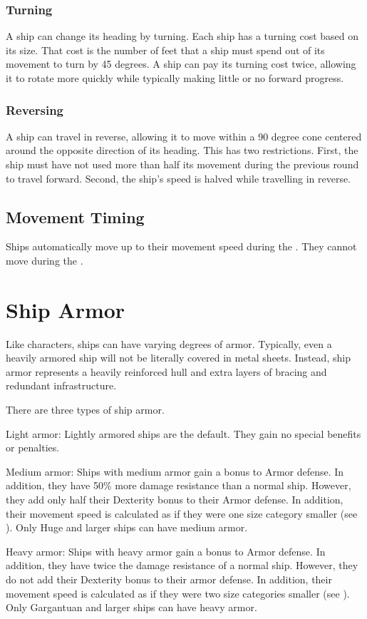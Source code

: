     \subsubsection{Turning}
      A ship can change its heading by turning.
      Each ship has a turning cost based on its size.
      That cost is the number of feet that a ship must spend out of its movement to turn by 45 degrees.
      A ship can pay its turning cost twice, allowing it to rotate more quickly while typically making little or no forward progress.

    \subsubsection{Reversing}
      A ship can travel in reverse, allowing it to move within a 90 degree cone centered around the opposite direction of its heading.
      This has two restrictions.
      First, the ship must have not used more than half its movement during the previous round to travel forward.
      Second, the ship's speed is halved while travelling in reverse.

  \subsection{Movement Timing}
    Ships automatically move up to their movement speed during the .
    They cannot move during the .

\section{Ship Armor}
  Like characters, ships can have varying degrees of armor.
  Typically, even a heavily armored ship will not be literally covered in metal sheets.
  Instead, ship armor represents a heavily reinforced hull and extra layers of bracing and redundant infrastructure.

  There are three types of ship armor.
  \begin{raggeditemize}
    \item Light armor: Lightly armored ships are the default. They gain no special benefits or penalties.
    \item Medium armor: Ships with medium armor gain a  bonus to Armor defense.
      In addition, they have 50\% more damage resistance than a normal ship.
      However, they add only half their Dexterity bonus to their Armor defense.
      In addition, their movement speed is calculated as if they were one size category smaller (see ).
      Only Huge and larger ships can have medium armor.
    \item Heavy armor: Ships with heavy armor gain a  bonus to Armor defense.
      In addition, they have twice the damage resistance of a normal ship.
      However, they do not add their Dexterity bonus to their armor defense.
      In addition, their movement speed is calculated as if they were two size categories smaller (see ).
      Only Gargantuan and larger ships can have heavy armor.
  \end{raggeditemize}

